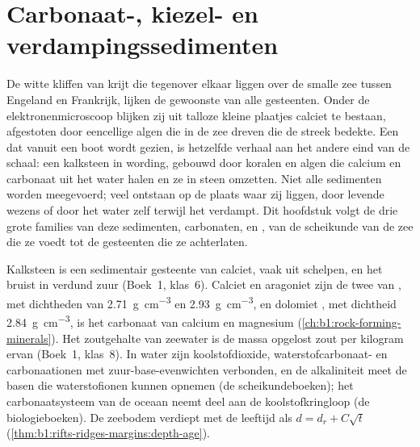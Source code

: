 \chapter{Carbonaat-, kiezel- en verdampingssedimenten}\label{ch:b1:chemical-biogenic-sediments}

De witte kliffen van krijt die tegenover elkaar liggen over de smalle zee tussen Engeland en Frankrijk, lijken de gewoonste van alle gesteenten. Onder de elektronenmicroscoop blijken zij uit talloze kleine plaatjes calciet te bestaan, afgestoten door eencellige algen die in de zee dreven die de streek bedekte. Een  dat vanuit een boot wordt gezien, is hetzelfde verhaal aan het andere eind van de schaal: een kalksteen in wording, gebouwd door koralen en algen die calcium en carbonaat uit het water halen en ze in steen omzetten. Niet alle sedimenten worden meegevoerd; veel ontstaan op de plaats waar zij liggen, door levende wezens of door het water zelf terwijl het verdampt. Dit hoofdstuk volgt de drie grote families van deze sedimenten, carbonaten,  en , van de scheikunde van de zee die ze voedt tot de gesteenten die ze achterlaten.

\begin{recall}
Kalksteen is een sedimentair gesteente van calciet, vaak uit schelpen, en het bruist in verdund zuur (Boek~1, klas~6). Calciet en aragoniet zijn de twee  van , met dichtheden van \qty{2.71}{g.cm^{-3}} en \qty{2.93}{g.cm^{-3}}, en dolomiet , met dichtheid \qty{2.84}{g.cm^{-3}}, is het carbonaat van calcium en magnesium (\cref{ch:b1:rock-forming-minerals}). Het zoutgehalte van zeewater is de massa opgelost zout per kilogram ervan (Boek~1, klas~8). In water zijn koolstofdioxide, waterstofcarbonaat- en carbonaationen met zuur-base-evenwichten verbonden, en de alkaliniteit meet de basen die waterstofionen kunnen opnemen (de scheikundeboeken); het carbonaatsysteem van de oceaan neemt deel aan de koolstofkringloop (de biologieboeken). De zeebodem verdiept met de leeftijd als $d = d_r + C\sqrt t$ (\cref{thm:b1:rifts-ridges-margins:depth-age}).
\end{recall}

